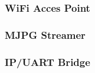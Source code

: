 \subsubsection{WiFi Acces Point}



\subsubsection{MJPG Streamer}




\subsubsection{IP/UART Bridge} 
